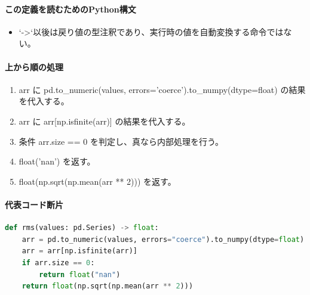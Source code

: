 \documentclass[a4paper,11pt]{article}
\begin{document}
            \paragraph{この定義を読むためのPython構文}
            \begin{itemize}[leftmargin=1.6em]
            \item `->`以後は戻り値の型注釈であり、実行時の値を自動変換する命令ではない。
            \end{itemize}
            \paragraph{上から順の処理}
            \begin{enumerate}[leftmargin=1.8em]
            \item arr に pd.to\_numeric(values, errors='coerce').to\_numpy(dtype=float) の結果を代入する。
\item arr に arr[np.isfinite(arr)] の結果を代入する。
\item 条件 arr.size == 0 を判定し、真なら内部処理を行う。
\item   float('nan') を返す。
\item float(np.sqrt(np.mean(arr ** 2))) を返す。
            \end{enumerate}
            \paragraph{代表コード断片}
            \begin{lstlisting}[language=Python]
def rms(values: pd.Series) -> float:
    arr = pd.to_numeric(values, errors="coerce").to_numpy(dtype=float)
    arr = arr[np.isfinite(arr)]
    if arr.size == 0:
        return float("nan")
    return float(np.sqrt(np.mean(arr ** 2)))
\end{lstlisting}
\end{document}
